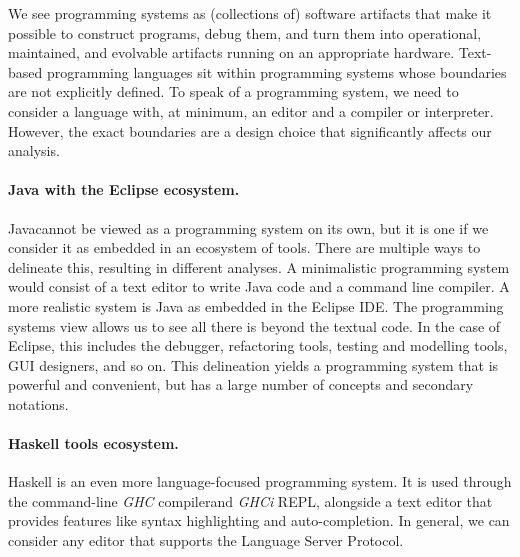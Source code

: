 \documentclass[english,submission]{programming}
\providecommand{\DIFadd}[1]{{\protect\color{blue}\uwave{#1}}} %
\providecommand{\DIFaddbegin}{} %
\providecommand{\DIFaddend}{} %
\begin{document}
We see programming systems as (collections of) software artifacts that
make it possible to construct programs, debug them, and turn them into
operational, maintained, and evolvable artifacts running on an
appropriate hardware. Text-based programming languages sit within
programming systems whose boundaries are not explicitly defined. To
speak of a programming system, we need to consider a language with, at
minimum, an editor and a compiler or interpreter. However, the exact
boundaries are a design choice that significantly affects our analysis.

\paragraph{Java with the Eclipse ecosystem.}

Java\DIFaddbegin \DIFadd{~\mbox{%
\cite{Java} }\hspace{0pt}%
}\DIFaddend cannot be viewed as a programming system on its own,
but it is one if we consider it as embedded in an ecosystem of tools.
There are multiple ways to delineate this, resulting in different
analyses. A minimalistic programming system would consist of a text
editor to write Java code and a command line compiler. A more realistic
system is Java as embedded in the Eclipse IDE\DIFaddbegin \DIFadd{~\mbox{%
\cite{Eclipse}}\hspace{0pt}%
}\DIFaddend . The
programming systems view allows us to see all there is beyond the
textual code. In the case of Eclipse, this includes the debugger,
refactoring tools, testing and modelling tools, GUI designers, and so
on. This delineation yields a programming system that is powerful and
convenient, but has a large number of concepts and secondary notations.

\paragraph{Haskell tools ecosystem.}

Haskell is an even more language-focused programming system. It is used
through the command-line \emph{GHC} compiler\DIFaddbegin \DIFadd{~\mbox{%
\cite{GHC} }\hspace{0pt}%
}\DIFaddend and \emph{GHCi}
REPL, alongside a text editor that provides features like syntax
highlighting and auto-completion. In general, we can consider any editor
that supports the Language Server Protocol\DIFaddbegin \DIFadd{~}\DIFaddend \cite{LSP}.
\end{document}
